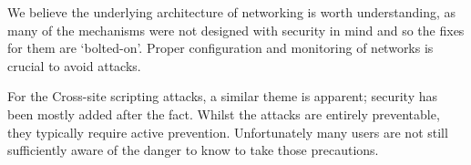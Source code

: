 We believe the underlying architecture of networking is worth understanding, as many of the mechanisms were not
designed with security in mind and so the fixes for them are `bolted-on'. Proper configuration and monitoring
of networks is crucial to avoid attacks.

For the Cross-site scripting attacks, a similar theme is apparent; security has been mostly added after the fact.
Whilst the attacks are entirely preventable, they typically require active prevention. Unfortunately many users
are not still sufficiently aware of the danger to know to take those precautions.
